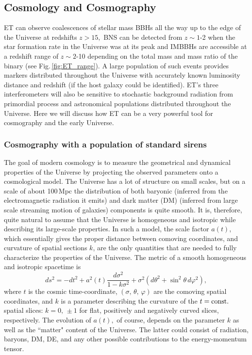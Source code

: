 \clearpage
\FloatBarrier
\subsection{Cosmology and Cosmography}
ET can observe coalescences of stellar mass BBHs all the way up 
to the edge of the Universe at redshifts $z>15,$ BNS
can be detected from $z\sim 1$-2 when the star formation 
rate in the Universe was at its peak and IMBBHs
are accessible at a redshift range of $z\sim 2$-10 depending on the
total mass and mass ratio of the binary (see Fig.\,\ref{fig:ET_range}).
A large population of such events provides markers distributed
throughout the Universe with accurately known luminosity distance 
and redshift (if the host galaxy could be identified). 
ET's three interferometers will also be sensitive to stochastic 
background radiation from primordial process and astronomical 
populations distributed throughout the Universe. Here we will
discuss how ET can be a very powerful tool for cosmography
and the early Universe.

\FloatBarrier
\subsubsection{Cosmography with a population of standard sirens}


The goal of modern cosmology is to measure the geometrical and
dynamical properties of the Universe by projecting the observed
parameters onto a cosmological model. The Universe has a lot
of structure on small scales, but on a scale of about
100\,Mpc %
the distribution of both baryonic (inferred from the
electromagnetic radiation it emits) and dark matter (DM)
(inferred from large scale streaming motion of galaxies)
components is quite smooth. It is, therefore, quite
natural to assume that the Universe is homogeneous and
isotropic while describing its large-scale properties.
In such a model, the scale factor $a(t)$, which essentially
gives the proper distance between comoving coordinates, and
curvature of spatial sections $k$, are the only quantities
that are needed to fully characterize the properties of
the Universe. The metric of a smooth homogeneous
and isotropic spacetime is
\begin{equation*}  %
ds^2 = -dt^2 + a^2(t) \frac{d\sigma^2}{1 - k\sigma^2}
+ \sigma^2 \left (d\theta^2 + \sin^2\theta\, d\varphi^2 \right ),
\end{equation*}
where $t$ is the cosmic time-coordinate, $(\sigma,\,\theta,\,
\varphi)$ are the comoving spatial coordinates, and $k$ is
a parameter describing the curvature of the $t=\rm const.$ 
spatial slices: $k=0,\,\pm 1$ for flat, positively
and negatively curved slices, respectively.
The evolution of $a(t),$ of course, depends on the parameter
$k$ as well as the ``matter" content of the Universe. The latter
could consist of radiation, baryons, DM, DE,
and any other possible contributions to the energy-momentum
tensor.

